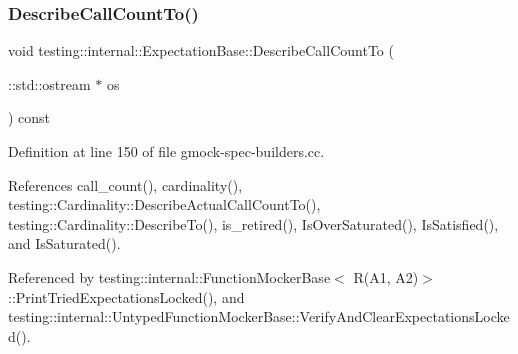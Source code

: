 \subsubsection{\texorpdfstring{Describe\+Call\+Count\+To()}{DescribeCallCountTo()}}
{\footnotesize\ttfamily void testing\+::internal\+::\+Expectation\+Base\+::\+Describe\+Call\+Count\+To (\begin{DoxyParamCaption}\item[{\+::std\+::ostream $\ast$}]{os }\end{DoxyParamCaption}) const}



Definition at line 150 of file gmock-\/spec-\/builders.\+cc.



References call\+\_\+count(), cardinality(), testing\+::\+Cardinality\+::\+Describe\+Actual\+Call\+Count\+To(), testing\+::\+Cardinality\+::\+Describe\+To(), is\+\_\+retired(), Is\+Over\+Saturated(), Is\+Satisfied(), and Is\+Saturated().



Referenced by testing\+::internal\+::\+Function\+Mocker\+Base$<$ R(\+A1, A2)$>$\+::\+Print\+Tried\+Expectations\+Locked(), and testing\+::internal\+::\+Untyped\+Function\+Mocker\+Base\+::\+Verify\+And\+Clear\+Expectations\+Locked().


